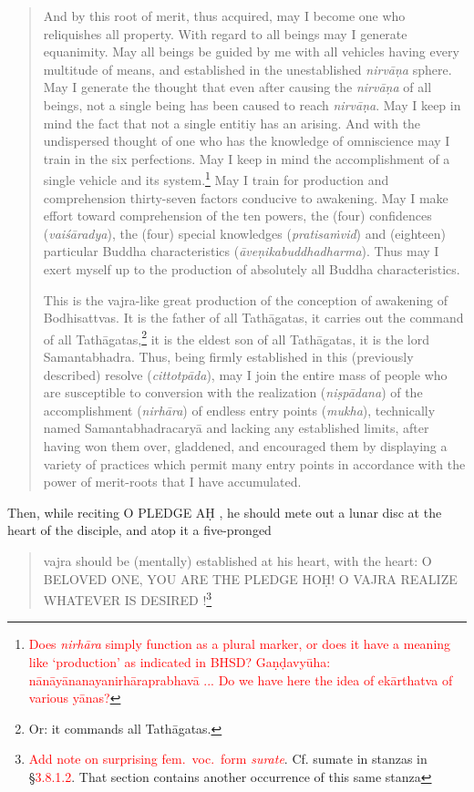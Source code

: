 \documentclass[11pt]{book}
\makeatletter
\def\fakesc#1{%
  \begingroup%
  \xdef\fake@name{\csname\curr@fontshape/\f@size\endcsname}%
  \fontsize{1.3\fontdimen8\fake@name}{\baselineskip}\selectfont%
  \uppercase{#1}%
  \endgroup%
}
\newcommand{\mantra}[1]{\fakesc{#1}}
\newcommand{\red}[1]{\textcolor{red}{#1}}
\newcommand{\skt}[1]{\emph{#1}}
\makeatother
\begin{document}
\begin{quote}
	And by this root of merit, thus acquired, %
	 may I become one who reliquishes all property. With regard to all beings may I generate equanimity. May all beings be guided by me with all vehicles having every multitude of means, and established in the unestablished \skt{nirvāṇa} sphere. May I generate the thought that even after causing the \skt{nirvāṇa} of all beings, not a single being has been caused to reach \skt{nirvāṇa}. May I keep in mind the fact that not a single entitiy has an arising. And with the undispersed thought of one who has the knowledge of omniscience may I train in the six perfections. May I keep in mind the accomplishment of a single vehicle and its system.\footnote{\red{Does \skt{nirhāra} simply function as a plural marker, or does it have a meaning like `production' as indicated in BHSD? Gaṇḍavyūha: nānāyānanayanirhāraprabhavā ... Do we have here the idea of ekārthatva of various yānas?}} May I train for production and comprehension thirty-seven factors conducive to awakening. May I make effort toward comprehension of the ten powers, the (four) confidences (\skt{vaiśāradya}), the (four) special knowledges (\skt{pratisaṁvid}) and (eighteen) particular Buddha characteristics (\skt{āveṇikabuddhadharma}). Thus may I exert myself up to the production of absolutely all Buddha characteristics.
	
	This is the vajra-like great production of the conception of awakening of Bodhisattvas. It is the father of all Tathāgatas, it carries out the command of all Tathāgatas,\footnote{Or: it commands all Tathāgatas.} it is the eldest son of all Tathāgatas, it is the lord Samantabhadra. Thus, being firmly established in this (previously described) resolve (\skt{cittotpāda}), may I join the entire mass of people who are susceptible to conversion with the realization (\skt{niṣpādana}) of the accomplishment (\skt{nirhāra}) of endless entry points (\skt{mukha}), technically named Samantabhadracaryā and lacking any established limits, after having won them over, gladdened, and encouraged them by displaying a variety of practices which permit many entry points in accordance with the power of merit-roots that I have accumulated.
\end{quote}

Then, while reciting \mantra{o pledge aḥ}, he should mete out a lunar disc at the heart of the disciple, and atop it a five-pronged

\begin{verse}
vajra should be (mentally) established at his heart, with the heart: \mantra{o beloved one, you are the pledge hoḥ! o vajra realize whatever is desired}!\footnote{\red{Add note on surprising fem.\ voc.\ form \skt{surate}}. Cf. sumate in stanzas in §\red{3.8.1.2}. That section contains another occurrence of this same stanza}
\end{verse}
\end{document}
